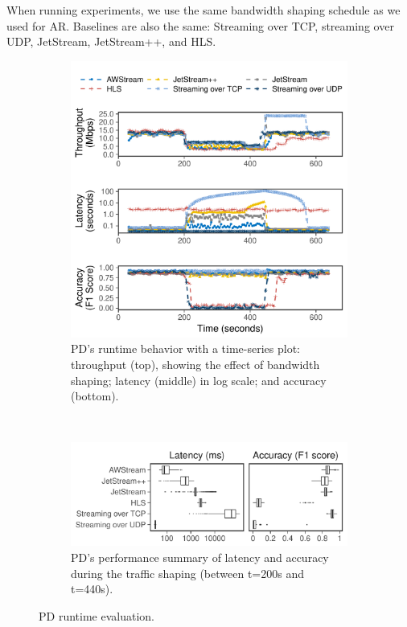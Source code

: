 \documentclass[twocolumn]{article}
\begin{document}
When running experiments, we use the same bandwidth shaping schedule as we used
for AR. Baselines are also the same: Streaming over TCP, streaming over UDP,
JetStream, JetStream++, and HLS.

\begin{figure}[t]
  \begin{subfigure}[t]{\columnwidth}
    \centering
    \includegraphics[width=\columnwidth]{figures/runtime_mot-timeseries.pdf}
    \caption{PD's runtime behavior with a time-series plot: throughput (top),
      showing the effect of bandwidth shaping; latency (middle) in log scale;
      and accuracy (bottom).}
    \label{fig:pd-runtime-timeseries}
  \end{subfigure}
  \vspace{1em}
  \\
  \begin{subfigure}[t]{\columnwidth}
    \centering
    \includegraphics[width=\columnwidth]{figures/runtime_mot-boxplot.pdf}
    \caption{PD's performance summary of latency and accuracy during the traffic
      shaping (between t=200s and t=440s).}
    \label{fig:pd-runtime-boxplot}
  \end{subfigure}
  \caption{PD runtime evaluation.}
  \label{fig:pd-runtime}
\end{figure}
\end{document}
